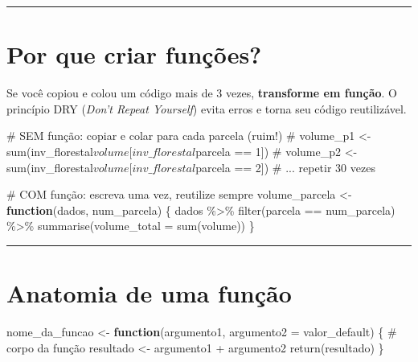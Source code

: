 \documentclass[
  letterpaper,
]{scrbook}
\newenvironment{Shaded}{\begin{snugshade}}{\end{snugshade}}
\newcommand{\AttributeTok}[1]{\textcolor[rgb]{0.40,0.45,0.13}{#1}}
\newcommand{\CommentTok}[1]{\textcolor[rgb]{0.37,0.37,0.37}{#1}}
\newcommand{\ControlFlowTok}[1]{\textcolor[rgb]{0.00,0.23,0.31}{\textbf{#1}}}
\newcommand{\FunctionTok}[1]{\textcolor[rgb]{0.28,0.35,0.67}{#1}}
\newcommand{\NormalTok}[1]{\textcolor[rgb]{0.00,0.23,0.31}{#1}}
\newcommand{\OtherTok}[1]{\textcolor[rgb]{0.00,0.23,0.31}{#1}}
\newcommand{\SpecialCharTok}[1]{\textcolor[rgb]{0.37,0.37,0.37}{#1}}
\begin{document}
\begin{center}\rule{0.5\linewidth}{0.5pt}\end{center}

\section{Por que criar funções?}\label{por-que-criar-funuxe7uxf5es}

Se você copiou e colou um código mais de 3 vezes, \textbf{transforme em
função}. O princípio DRY (\emph{Don't Repeat Yourself}) evita erros e
torna seu código reutilizável.

\begin{Shaded}
\begin{Highlighting}[]
\CommentTok{\# SEM função: copiar e colar para cada parcela (ruim!)}
\CommentTok{\# volume\_p1 \textless{}{-} sum(inv\_florestal$volume[inv\_florestal$parcela == 1])}
\CommentTok{\# volume\_p2 \textless{}{-} sum(inv\_florestal$volume[inv\_florestal$parcela == 2])}
\CommentTok{\# ... repetir 30 vezes}

\CommentTok{\# COM função: escreva uma vez, reutilize sempre}
\NormalTok{volume\_parcela }\OtherTok{\textless{}{-}} \ControlFlowTok{function}\NormalTok{(dados, num\_parcela) \{}
\NormalTok{  dados }\SpecialCharTok{\%\textgreater{}\%} 
    \FunctionTok{filter}\NormalTok{(parcela }\SpecialCharTok{==}\NormalTok{ num\_parcela) }\SpecialCharTok{\%\textgreater{}\%} 
    \FunctionTok{summarise}\NormalTok{(}\AttributeTok{volume\_total =} \FunctionTok{sum}\NormalTok{(volume))}
\NormalTok{\}}
\end{Highlighting}
\end{Shaded}

\begin{center}\rule{0.5\linewidth}{0.5pt}\end{center}

\section{Anatomia de uma função}\label{anatomia-de-uma-funuxe7uxe3o}

\begin{Shaded}
\begin{Highlighting}[]
\NormalTok{nome\_da\_funcao }\OtherTok{\textless{}{-}} \ControlFlowTok{function}\NormalTok{(argumento1, }\AttributeTok{argumento2 =}\NormalTok{ valor\_default) \{}
  \CommentTok{\# corpo da função}
\NormalTok{  resultado }\OtherTok{\textless{}{-}}\NormalTok{ argumento1 }\SpecialCharTok{+}\NormalTok{ argumento2}
  \FunctionTok{return}\NormalTok{(resultado)}
\NormalTok{\}}
\end{Highlighting}
\end{Shaded}
\end{document}
